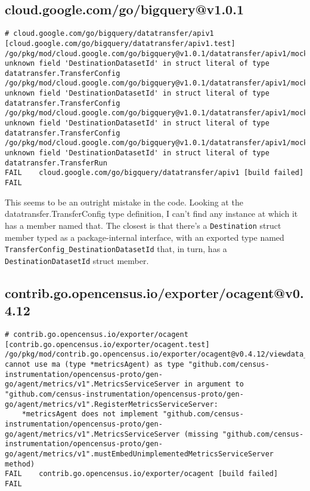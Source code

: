 \subsection{cloud.google.com/go/bigquery@v1.0.1}
\begin{verbatim}
# cloud.google.com/go/bigquery/datatransfer/apiv1 [cloud.google.com/go/bigquery/datatransfer/apiv1.test]
/go/pkg/mod/cloud.google.com/go/bigquery@v1.0.1/datatransfer/apiv1/mock_test.go:428:3: unknown field 'DestinationDatasetId' in struct literal of type datatransfer.TransferConfig
/go/pkg/mod/cloud.google.com/go/bigquery@v1.0.1/datatransfer/apiv1/mock_test.go:507:3: unknown field 'DestinationDatasetId' in struct literal of type datatransfer.TransferConfig
/go/pkg/mod/cloud.google.com/go/bigquery@v1.0.1/datatransfer/apiv1/mock_test.go:638:3: unknown field 'DestinationDatasetId' in struct literal of type datatransfer.TransferConfig
/go/pkg/mod/cloud.google.com/go/bigquery@v1.0.1/datatransfer/apiv1/mock_test.go:845:3: unknown field 'DestinationDatasetId' in struct literal of type datatransfer.TransferRun
FAIL	cloud.google.com/go/bigquery/datatransfer/apiv1 [build failed]
FAIL
\end{verbatim}

This seems to be an outright mistake in the code. Looking at the
datatransfer.TransferConfig type definition, I can't find any instance
at which it has a member named that. The closest is that there's a
{\tt Destination} struct member typed as a package-internal interface,
with an exported type named {\tt TransferConfig_DestinationDatasetId}
that, in turn, has a {\tt DestinationDatasetId} struct member.

\subsection{contrib.go.opencensus.io/exporter/ocagent@v0.4.12}
\begin{verbatim}
# contrib.go.opencensus.io/exporter/ocagent [contrib.go.opencensus.io/exporter/ocagent.test]
/go/pkg/mod/contrib.go.opencensus.io/exporter/ocagent@v0.4.12/viewdata_to_metrics_test.go:51:45: cannot use ma (type *metricsAgent) as type "github.com/census-instrumentation/opencensus-proto/gen-go/agent/metrics/v1".MetricsServiceServer in argument to "github.com/census-instrumentation/opencensus-proto/gen-go/agent/metrics/v1".RegisterMetricsServiceServer:
	*metricsAgent does not implement "github.com/census-instrumentation/opencensus-proto/gen-go/agent/metrics/v1".MetricsServiceServer (missing "github.com/census-instrumentation/opencensus-proto/gen-go/agent/metrics/v1".mustEmbedUnimplementedMetricsServiceServer method)
FAIL	contrib.go.opencensus.io/exporter/ocagent [build failed]
FAIL
\end{verbatim}

